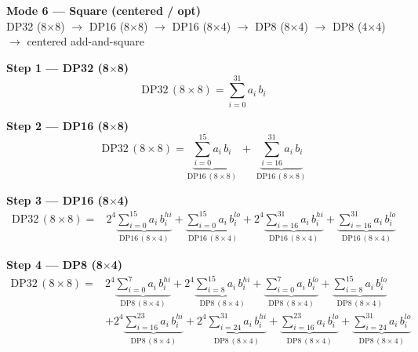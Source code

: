 \documentclass[fleqn]{article}
\newcommand{\DPop}[3]{\mathrm{DP#1}\,(#2\!\times\!#3)}
\begin{document}
\begin{center}
{\LARGE \textbf{Mode 6 --- Square (centered / opt)}}\\[4pt]
{\large DP32 (8$\times$8) $\rightarrow$ DP16 (8$\times$8) $\rightarrow$ DP16 (8$\times$4) $\rightarrow$ DP8 (8$\times$4) $\rightarrow$ DP8 (4$\times$4) $\rightarrow$ centered add-and-square}
\end{center}

\vspace{0.1em}

\textbf{Step 1 --- DP32 (8$\times$8)}
\[
\DPop{32}{8}{8} = \sum_{i=0}^{31} a_i \, b_i
\]

\textbf{Step 2 --- DP16 (8$\times$8)}
\[
\DPop{32}{8}{8}
  = \underbrace{\sum_{i=0}^{15} a_i \, b_i}_{\DPop{16}{8}{8}}
  \; + \; \underbrace{\sum_{i=16}^{31} a_i \, b_i}_{\DPop{16}{8}{8}}
\]

\textbf{Step 3 --- DP16 (8$\times$4)}
\begin{align*}
\DPop{32}{8}{8} = {}
  & 2^{4}\underbrace{\sum_{i=0}^{15} a_i \, b_i^{hi}}_{\DPop{16}{8}{4}}
  + \underbrace{\sum_{i=0}^{15} a_i \, b_i^{lo}}_{\DPop{16}{8}{4}}
  + 2^{4}\underbrace{\sum_{i=16}^{31} a_i \, b_i^{hi}}_{\DPop{16}{8}{4}}
  + \underbrace{\sum_{i=16}^{31} a_i \, b_i^{lo}}_{\DPop{16}{8}{4}}
\end{align*}

\textbf{Step 4 --- DP8 (8$\times$4)}
\begin{align*}
\DPop{32}{8}{8} = {}
  & 2^{4}\underbrace{\sum_{i=0}^{7} a_i \, b_i^{hi}}_{\DPop{8}{8}{4}}
  + 2^{4}\underbrace{\sum_{i=8}^{15} a_i \, b_i^{hi}}_{\DPop{8}{8}{4}}
  + \underbrace{\sum_{i=0}^{7} a_i \, b_i^{lo}}_{\DPop{8}{8}{4}}
  + \underbrace{\sum_{i=8}^{15} a_i \, b_i^{lo}}_{\DPop{8}{8}{4}} \\[0.6em]
  & + 2^{4}\underbrace{\sum_{i=16}^{23} a_i \, b_i^{hi}}_{\DPop{8}{8}{4}}
  + 2^{4}\underbrace{\sum_{i=24}^{31} a_i \, b_i^{hi}}_{\DPop{8}{8}{4}}
  + \underbrace{\sum_{i=16}^{23} a_i \, b_i^{lo}}_{\DPop{8}{8}{4}}
  + \underbrace{\sum_{i=24}^{31} a_i \, b_i^{lo}}_{\DPop{8}{8}{4}}
\end{align*}
\end{document}
